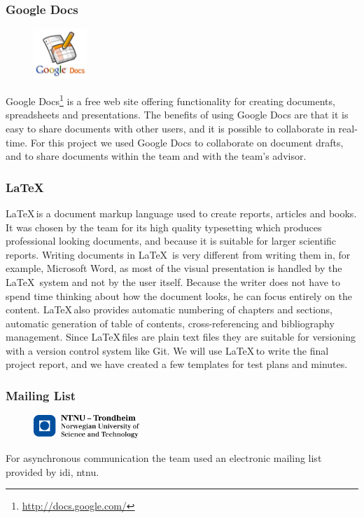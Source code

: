 \subsubsection{Google Docs}
\begin{figure}
	\vspace{-20pt}
	\includegraphics[width=2cm]{./planning/img/google_docs_logo}
	\vspace{-20pt}
\end{figure}
Google Docs\footnote{\url{http://docs.google.com/}} is a free web site offering
functionality for creating documents, spreadsheets and presentations.
The benefits of using Google Docs are that it is easy to share documents with other users, and
it is possible to collaborate in real-time. For this project we used Google Docs
to collaborate on document drafts, and to share documents within the team and
with the team's advisor.

\subsubsection{\LaTeX}
\LaTeX \,is a document \gls{markup language} used to
create reports, articles and books. It was chosen by the team for its 
high quality typesetting which produces professional looking documents, and 
because it is suitable for larger scientific reports.\cite{NotSoShorGuideToLatex} 
Writing documents in \LaTeX \ is very different from writing them in, for example,
Microsoft Word, as most of the visual presentation is handled by the \LaTeX \ system 
and not by the user itself. Because the writer does not have to spend time
thinking about how the document looks, he can focus entirely on the content.
\LaTeX \,also provides automatic numbering of chapters and sections,
automatic generation of table of contents, cross-referencing and bibliography
management. Since \LaTeX \,files are plain text files they are suitable for versioning 
with a \gls{version control system} like Git. We will use \LaTeX \,to write the final project 
report, and we have created a few templates for test plans and minutes.

\subsubsection{Mailing List}
\begin{figure}
	\vspace{-20pt}
	\includegraphics[width=4cm]{./planning/img/ntnu_logo}
	\vspace{-20pt}
\end{figure}
For asynchronous communication the team used an electronic mailing list
provided by \Gls{idi}, \Gls{ntnu}.

